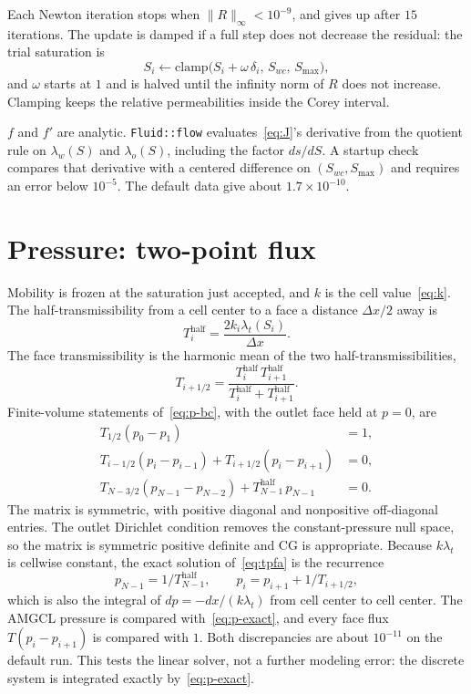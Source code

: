 \documentclass[11pt]{article}
\begin{document}
Each Newton iteration stops when $\|R\|_\infty < 10^{-9}$, and gives up after $15$ iterations.
The update is damped if a full step does not decrease the residual: the trial saturation is
\[
S_i \leftarrow \mathrm{clamp}\bigl(S_i + \omega\,\delta_i,\, S_{wc},\, S_{\max}\bigr),
\]
and $\omega$ starts at $1$ and is halved until the infinity norm of $R$ does not increase.
Clamping keeps the relative permeabilities inside the Corey interval.

$f$ and $f'$ are analytic.
\texttt{Fluid::flow} evaluates~\eqref{eq:J}'s derivative from the quotient rule on $\lambda_w(S)$ and $\lambda_o(S)$, including the factor $ds/dS$.
A startup check compares that derivative with a centered difference on $(S_{wc}, S_{\max})$ and requires an error below $10^{-5}$.
The default data give about $1.7\times 10^{-10}$.

\section{Pressure: two-point flux}

Mobility is frozen at the saturation just accepted, and $k$ is the cell value~\eqref{eq:k}.
The half-transmissibility from a cell center to a face a distance $\Delta x/2$ away is
\begin{equation}
\label{eq:half}
T_i^{\mathrm{half}} = \frac{2 k_i \lambda_t(S_i)}{\Delta x}.
\end{equation}
The face transmissibility is the harmonic mean of the two half-transmissibilities,
\begin{equation}
\label{eq:face}
T_{i+1/2}
=
\frac{T_i^{\mathrm{half}}\, T_{i+1}^{\mathrm{half}}}{T_i^{\mathrm{half}} + T_{i+1}^{\mathrm{half}}}.
\end{equation}
Finite-volume statements of~\eqref{eq:p-bc}, with the outlet face held at $p=0$, are
\begin{equation}
\label{eq:tpfa}
\begin{aligned}
T_{1/2}(p_0 - p_1) &= 1,\\
T_{i-1/2}(p_i - p_{i-1}) + T_{i+1/2}(p_i - p_{i+1}) &= 0,\\
T_{N-3/2}(p_{N-1} - p_{N-2}) + T_{N-1}^{\mathrm{half}}\, p_{N-1} &= 0.
\end{aligned}
\end{equation}
The matrix is symmetric, with positive diagonal and nonpositive off-diagonal entries.
The outlet Dirichlet condition removes the constant-pressure null space, so the matrix is symmetric positive definite and CG is appropriate.
Because $k\lambda_t$ is cellwise constant, the exact solution of~\eqref{eq:tpfa} is the recurrence
\begin{equation}
\label{eq:p-exact}
p_{N-1} = 1/T_{N-1}^{\mathrm{half}},
\qquad
p_i = p_{i+1} + 1/T_{i+1/2},
\end{equation}
which is also the integral of $dp = -dx/(k\lambda_t)$ from cell center to cell center.
The AMGCL pressure is compared with~\eqref{eq:p-exact}, and every face flux $T(p_i-p_{i+1})$ is compared with $1$.
Both discrepancies are about $10^{-11}$ on the default run.
This tests the linear solver, not a further modeling error: the discrete system is integrated exactly by~\eqref{eq:p-exact}.
\end{document}
